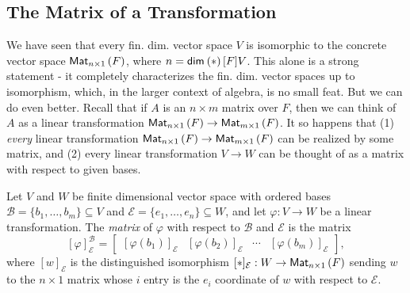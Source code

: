 \documentclass{memoir}
\begin{document}
\subsection*{The Matrix of a Transformation}
\setcounter{section}{9}

We have seen that every fin. dim. vector space $V$ is isomorphic to the concrete vector space ${\mathsf{Mat}_{{n} \times {1}}}\left(F\right)$, where $n = \operatorname{\mathsf{dim}}_{}\left(*\right)[F]{V}$. This alone is a strong statement - it completely characterizes the fin. dim. vector spaces up to isomorphism, which, in the larger context of algebra, is no small feat. But we can do even better. Recall that if $A$ is an $n \times m$ matrix over $F$, then we can think of $A$ as a linear transformation ${\mathsf{Mat}_{{n} \times {1}}}\left(F\right) \rightarrow {\mathsf{Mat}_{{m} \times {1}}}\left(F\right)$. It so happens that (1) \emph{every} linear transformation ${\mathsf{Mat}_{{n} \times {1}}}\left(F\right) \rightarrow {\mathsf{Mat}_{{m} \times {1}}}\left(F\right)$ can be realized by some matrix, and (2) every linear transformation $V \rightarrow W$ can be thought of as a matrix with respect to given bases.

\begin{dfn}
Let $V$ and $W$ be finite dimensional vector space with ordered bases $\mathcal{B} = \{b_1,\ldots,b_m\} \subseteq V$ and $\mathcal{E} = \{e_1, \ldots, e_n\} \subseteq W$, and let $\varphi : V \rightarrow W$ be a linear transformation. The \emph{matrix} of $\varphi$ with respect to $\mathcal{B}$ and $\mathcal{E}$ is the matrix \[ [\varphi]^\mathcal{B}_\mathcal{E} = \left[\begin{array}{c|c|c|c} [\varphi(b_1)]_\mathcal{E} & [\varphi(b_2)]_\mathcal{E} & \cdots & [\varphi(b_m)]_\mathcal{E} \end{array}\right], \] where $[w]_\mathcal{E}$ is the distinguished isomorphism $[\ast]_\mathcal{E} : W \rightarrow {\mathsf{Mat}_{{n} \times {1}}}\left(F\right)$ sending $w$ to the $n \times 1$ matrix whose $i$ entry is the $e_i$ coordinate of $w$ with respect to $\mathcal{E}$.
\end{dfn}
\end{document}
